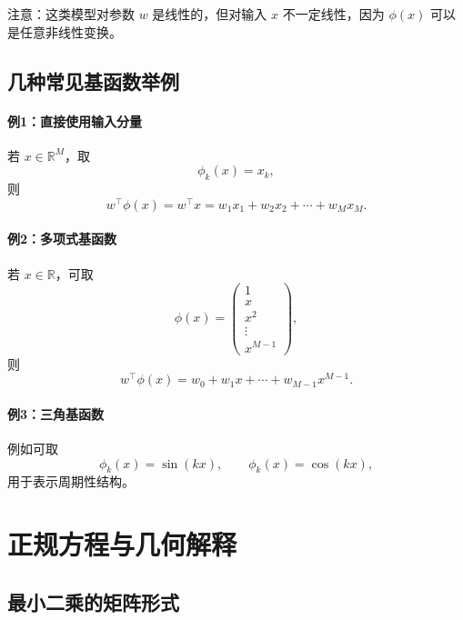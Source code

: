 注意：这类模型对参数 $w$ 是线性的，但对输入 $x$ 不一定线性，因为 $\phi(x)$ 可以是任意非线性变换。

\subsection{几种常见基函数举例}

\paragraph{例1：直接使用输入分量}
若 $x\in\mathbb{R}^M$，取
\[
\phi_k(x)=x_k,
\]
则
\[
w^{\top}\phi(x)=w^{\top}x=w_1x_1+w_2x_2+\cdots+w_Mx_M.
\]

\paragraph{例2：多项式基函数}
若 $x\in\mathbb{R}$，可取
\[
\phi(x)=
\begin{pmatrix}
1\\
x\\
x^2\\
\vdots\\
x^{M-1}
\end{pmatrix},
\]
则
\[
w^{\top}\phi(x)=w_0+w_1x+\cdots+w_{M-1}x^{M-1}.
\]

\paragraph{例3：三角基函数}
例如可取
\[
\phi_k(x)=\sin(kx),\qquad \phi_k(x)=\cos(kx),
\]
用于表示周期性结构。

\section{正规方程与几何解释}

\subsection{最小二乘的矩阵形式}

